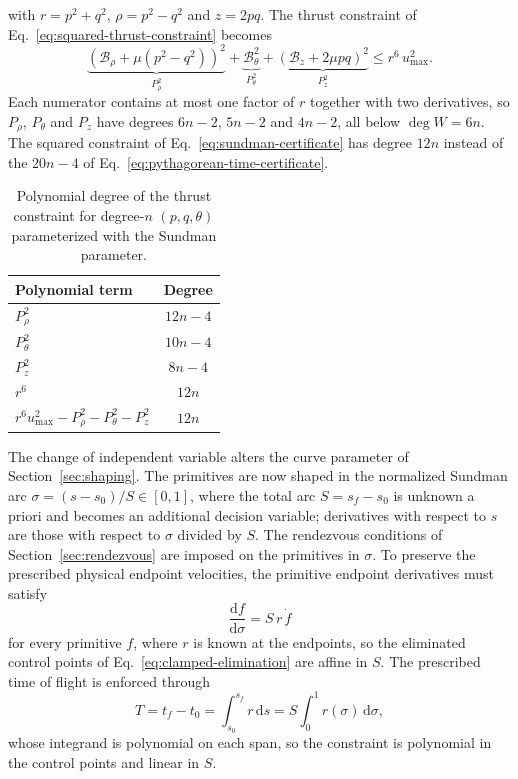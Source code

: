 \documentclass[a4paper,fleqn]{cas-sc}
\begin{document}
with $r=p^2+q^2$, $\rho=p^2-q^2$ and $z=2pq$. The thrust constraint of
Eq.~\eqref{eq:squared-thrust-constraint} becomes
\begin{equation}
	\underbrace{
		\left(\mathcal B_\rho+\mu (p^2-q^2)\right)^2
	}_{P_\rho^{2}}
	+
	\underbrace{
		\mathcal B_\theta^{2}
	}_{P_\theta^{2}}
	+
	\underbrace{
		\left(\mathcal B_z+2\mu pq\right)^2
	}_{P_z^{2}}
	\leq
	r^6\,u_{\max}^2.
	\label{eq:sundman-certificate}
\end{equation}
Each numerator contains at most one factor of $r$ together with two
derivatives, so $P_\rho$, $P_\theta$ and $P_z$ have degrees $6n-2$, $5n-2$
and $4n-2$, all below $\deg W=6n$. The squared constraint of
Eq.~\eqref{eq:sundman-certificate} has degree $12n$ instead of the $20n-4$
of Eq.~\eqref{eq:pythagorean-time-certificate}.

\begin{table}[htbp]
	\centering
	\caption{Polynomial degree of the thrust constraint for degree-$n$
		$(p,q,\theta)$ parameterized with the Sundman parameter.}
	\label{tab:sundman-certificate-degrees}
	\begin{tabular}{lc}
		\toprule
		\textbf{Polynomial term} & \textbf{Degree} \\
		\midrule
		$P_\rho^{2}$   & $12n-4$ \\
		$P_\theta^{2}$ & $10n-4$ \\
		$P_z^{2}$      & $8n-4$ \\
		$r^6$      & $12n$   \\
		\midrule
		$r^6 u_{\max}^2-P_\rho^{2}-P_\theta^{2}-P_z^{2}$
		& $12n$ \\
		\bottomrule
	\end{tabular}
\end{table}

The change of independent variable alters the curve parameter of
Section~\ref{sec:shaping}. The primitives are now shaped in the normalized
Sundman arc $\sigma=(s-s_0)/S\in[0,1]$, where the total arc
$S=s_f-s_0$ is unknown a priori and becomes an additional decision variable;
derivatives with respect to $s$ are those with respect to $\sigma$ divided by
$S$. The rendezvous conditions of Section~\ref{sec:rendezvous} are imposed
on the primitives in $\sigma$. To preserve the prescribed physical endpoint
velocities, the primitive endpoint derivatives must satisfy
\begin{equation}
	\frac{\mathrm{d}f}{\mathrm{d}\sigma}=S\,r\,\dot f
	\label{eq:sundman-endpoint-rates}
\end{equation}
for every primitive $f$, where $r$ is known at the endpoints, so the
eliminated control points of Eq.~\eqref{eq:clamped-elimination} are affine
in $S$. The prescribed time of flight is enforced through
\begin{equation}
	T=t_f-t_0
	=\int_{s_0}^{s_f}r\,\mathrm{d}s
	=S\int_{0}^{1}r(\sigma)\,\mathrm{d}\sigma,
	\label{eq:normalized-sundman-time-of-flight}
\end{equation}
whose integrand is polynomial on each span, so the constraint is polynomial
in the control points and linear in $S$.
\end{document}
